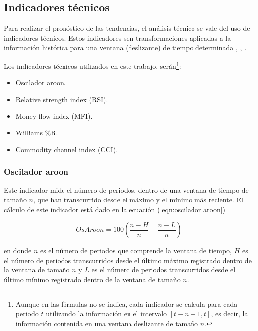 \documentclass[12pt]{scrbook}
\theoremstyle{break}
\theoremstyle{break}
\begin{document}
\subsection{Indicadores técnicos}
\label{subseccion:indicadores tecnicos}
Para realizar el pronóstico de las tendencias, el análisis técnico se vale del uso de indicadores técnicos. Estos indicadores son transformaciones aplicadas a la información histórica para una ventana (deslizante) de tiempo determinada \cite{murphy1999technical}, \cite{technicalAnalysisKirkPatrick}, \cite{encycoplediaTechnicalIndicators}.

Los indicadores técnicos utilizados en este trabajo, serán\footnote{Aunque en las fórmulas no se indica, cada indicador se calcula para cada periodo $t$ utilizando la información en el intervalo $\left[t-n + 1, t\right]$, es decir, la información contenida en una ventana deslizante de tamaño $n$. }:

\begin{itemize}
\item Oscilador aroon.

\item Relative strength index (RSI).

\item Money flow index (MFI).

\item Williams \%R.

\item Commodity channel index (CCI).
\end{itemize}


\subsubsection{Oscilador aroon}
\label{subsubseccion:Oscilador Aroon}
Este indicador mide el número de periodos, dentro de una ventana de tiempo de tamaño $n$, que han transcurrido desde el máximo y el mínimo más reciente. El cálculo de este indicador está dado en la ecuación (\ref{eqn:oscilador aroon})

\begin{equation} \label{eqn:oscilador aroon}
OsAroon = 100 \left( \dfrac{  n - H  } { n } - \dfrac{  n - L  } { n } \right)
\end{equation}

en donde $n$ es el número de periodos que comprende la ventana de tiempo, $H$ es el número de periodos transcurridos desde el último máximo registrado dentro de la ventana de tamaño $n$ y $L$ es el número de periodos transcurridos desde el último mínimo registrado dentro de la ventana de tamaño $n$.
\end{document}
